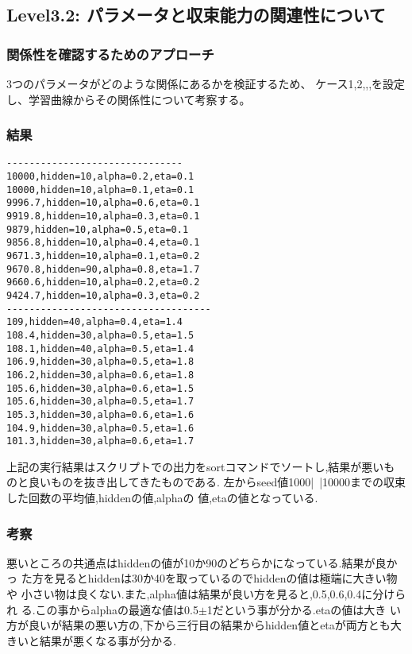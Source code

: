\subsection{Level3.2: パラメータと収束能力の関連性について}
\subsubsection{関係性を確認するためのアプローチ}
3つのパラメータがどのような関係にあるかを検証するため、
ケース1,2,,,を設定し、学習曲線からその関係性について考察する。

\subsubsection{結果}
\begin{verbatim}
-------------------------------
10000,hidden=10,alpha=0.2,eta=0.1
10000,hidden=10,alpha=0.1,eta=0.1
9996.7,hidden=10,alpha=0.6,eta=0.1
9919.8,hidden=10,alpha=0.3,eta=0.1
9879,hidden=10,alpha=0.5,eta=0.1
9856.8,hidden=10,alpha=0.4,eta=0.1
9671.3,hidden=10,alpha=0.1,eta=0.2
9670.8,hidden=90,alpha=0.8,eta=1.7
9660.6,hidden=10,alpha=0.2,eta=0.2
9424.7,hidden=10,alpha=0.3,eta=0.2
------------------------------------
109,hidden=40,alpha=0.4,eta=1.4
108.4,hidden=30,alpha=0.5,eta=1.5
108.1,hidden=40,alpha=0.5,eta=1.4
106.9,hidden=30,alpha=0.5,eta=1.8
106.2,hidden=30,alpha=0.6,eta=1.8
105.6,hidden=30,alpha=0.6,eta=1.5
105.6,hidden=30,alpha=0.5,eta=1.7
105.3,hidden=30,alpha=0.6,eta=1.6
104.9,hidden=30,alpha=0.5,eta=1.6
101.3,hidden=30,alpha=0.6,eta=1.7
\end{verbatim}
上記の実行結果はスクリプトでの出力をsortコマンドでソートし,結果が悪いも
のと良いものを抜き出してきたものである.
左からseed値1000|~|10000までの収束した回数の平均値,hiddenの値,alphaの
値,etaの値となっている.
\subsubsection{考察}
悪いところの共通点はhiddenの値が10か90のどちらかになっている.結果が良かっ
た方を見るとhiddenは30か40を取っているのでhiddenの値は極端に大きい物や
小さい物は良くない.また,alpha値は結果が良い方を見ると,0.5,0.6,0.4に分けられ
る.この事からalphaの最適な値は0.5$\pm$1だという事が分かる.etaの値は大き
い方が良いが結果の悪い方の,下から三行目の結果からhidden値とetaが両方とも大きいと結果が悪くなる事が分かる.
